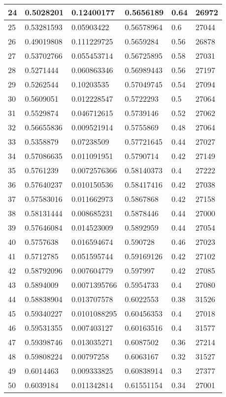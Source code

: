 \begin{longtable}{|l|l|l|l|l|l|}
24 & 0.5028201 & 0.12400177 & 0.5656189 & 0.64 & 26972 \\ \hline 
25 & 0.53281593 & 0.05903422 & 0.56578964 & 0.6 & 27044 \\ \hline 
26 & 0.49019808 & 0.111229725 & 0.5659284 & 0.56 & 26878 \\ \hline 
27 & 0.53702766 & 0.055453714 & 0.56725895 & 0.58 & 27031 \\ \hline 
28 & 0.5271444 & 0.060863346 & 0.56989443 & 0.56 & 27197 \\ \hline 
29 & 0.5262544 & 0.10203535 & 0.57049745 & 0.54 & 27094 \\ \hline 
30 & 0.5609051 & 0.012228547 & 0.5722293 & 0.5 & 27064 \\ \hline 
31 & 0.5529874 & 0.046712615 & 0.5739146 & 0.52 & 27062 \\ \hline 
32 & 0.56655836 & 0.009521914 & 0.5755869 & 0.48 & 27064 \\ \hline 
33 & 0.5358879 & 0.07238509 & 0.57721645 & 0.44 & 27027 \\ \hline 
34 & 0.57086635 & 0.011091951 & 0.5790714 & 0.42 & 27149 \\ \hline 
35 & 0.5761239 & 0.0072576366 & 0.58140373 & 0.4 & 27222 \\ \hline 
36 & 0.57640237 & 0.010150536 & 0.58417416 & 0.42 & 27038 \\ \hline 
37 & 0.57583016 & 0.011662973 & 0.5867868 & 0.42 & 27158 \\ \hline 
38 & 0.58131444 & 0.008685231 & 0.5878446 & 0.44 & 27000 \\ \hline 
39 & 0.57646084 & 0.014523009 & 0.5892959 & 0.44 & 27054 \\ \hline 
40 & 0.5757638 & 0.016594674 & 0.590728 & 0.46 & 27023 \\ \hline 
41 & 0.5712785 & 0.051595744 & 0.59169126 & 0.42 & 27102 \\ \hline 
42 & 0.58792096 & 0.007604779 & 0.597997 & 0.42 & 27085 \\ \hline 
43 & 0.5894009 & 0.0071395766 & 0.5954733 & 0.4 & 27080 \\ \hline 
44 & 0.58838904 & 0.013707578 & 0.6022553 & 0.38 & 31526 \\ \hline 
45 & 0.59340227 & 0.0101088295 & 0.60456353 & 0.4 & 27018 \\ \hline 
46 & 0.59531355 & 0.007403127 & 0.60163516 & 0.4 & 31577 \\ \hline 
47 & 0.59398746 & 0.013035271 & 0.6087502 & 0.36 & 27214 \\ \hline 
48 & 0.59808224 & 0.00797258 & 0.6063167 & 0.32 & 31527 \\ \hline 
49 & 0.6014463 & 0.009333825 & 0.60838914 & 0.3 & 27377 \\ \hline 
50 & 0.6039184 & 0.011342814 & 0.61551154 & 0.34 & 27001 \\ \hline 
\end{longtable}